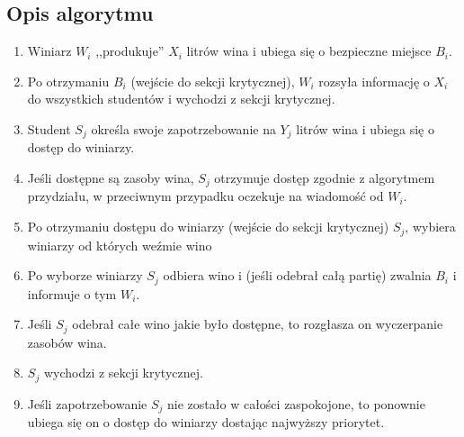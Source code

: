 \documentclass[12pt, a4paper, twoside]{article}
\begin{document}
\subsection*{Opis algorytmu}

\begin{enumerate}
    \item Winiarz $ W_{i} $ ,,produkuje'' $ X_{i} $ litrów wina i ubiega się o bezpieczne miejsce $ B_{i} $.
    \item Po otrzymaniu $ B_{i} $ (wejście do sekcji krytycznej), $ W_{i} $ rozsyła informację o $ X_{i} $ do wszystkich studentów i wychodzi z sekcji krytycznej.
    \item Student $ S_{j} $ określa swoje zapotrzebowanie na $ Y_{j} $ litrów wina i ubiega się o dostęp do winiarzy.
    \item Jeśli dostępne są zasoby wina, $ S_{j} $ otrzymuje dostęp zgodnie z algorytmem przydziału, w przeciwnym przypadku oczekuje na wiadomość od $ W_{i} $.
    \item Po otrzymaniu dostępu do winiarzy (wejście do sekcji krytycznej) $ S_{j} $, wybiera winiarzy od których weźmie wino
    \item Po wyborze winiarzy $ S_{j} $ odbiera wino i (jeśli odebrał całą partię) zwalnia $ B_{i} $ i informuje  o tym $ W_{i} $.
    \item Jeśli $ S_{j} $ odebrał całe wino jakie było dostępne, to rozgłasza on wyczerpanie zasobów wina.
    \item $ S_{j} $ wychodzi z sekcji krytycznej.
    \item Jeśli zapotrzebowanie $ S_{j} $ nie zostało w całości zaspokojone, to ponownie ubiega się on o dostęp do winiarzy dostając najwyższy priorytet.
\end{enumerate}
\end{document}
